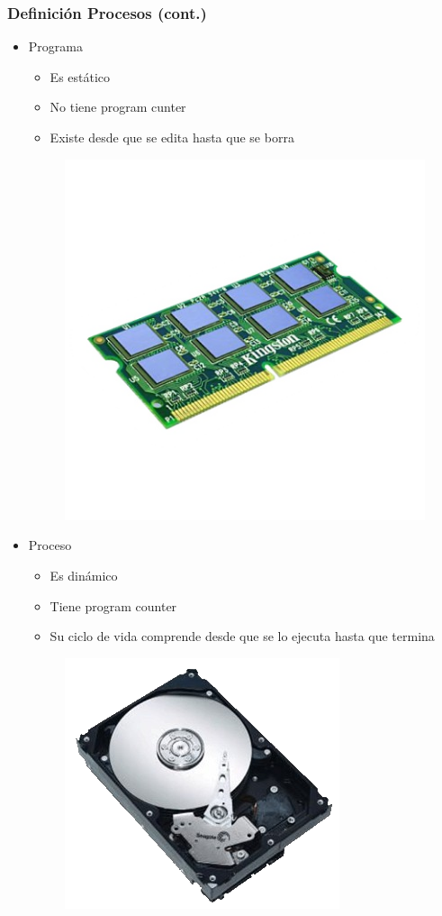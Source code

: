 \begin{frame}
  \frametitle{Definición Procesos (cont.)}
  \begin{itemize}
	  \item Programa
	  \begin{itemize}
	  	\item Es estático
	  	\item No tiene program cunter
	  	\item Existe desde que se edita hasta que se borra
	  \end{itemize}
	  \begin{figure}
		    \includegraphics[scale=0.1]{images/process.png}
	  \end{figure}
	  \item Proceso
	  \begin{itemize}
	  	\item Es dinámico
	  	\item Tiene program counter
	  	\item Su ciclo de vida comprende desde que se lo ejecuta hasta que termina
	  \end{itemize}
	  \begin{figure}
			\includegraphics[scale=0.1]{images/program.png}
	  \end{figure}	  
  \end{itemize}
\end{frame}

